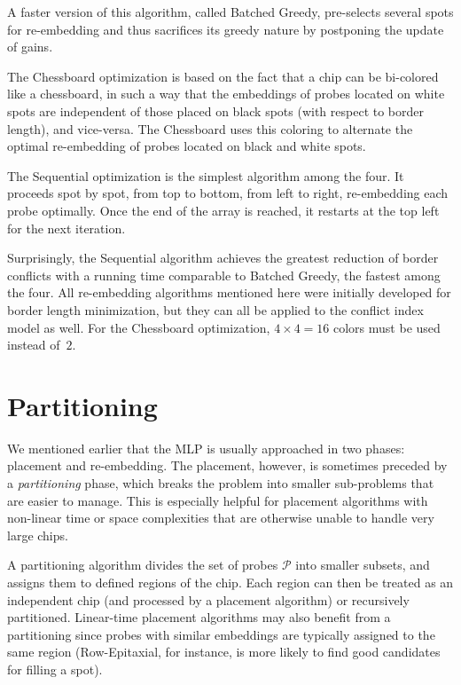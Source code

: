 \documentclass{w-edbk}
\begin{document}
A faster version of this algorithm, called Batched Greedy, pre-selects
several spots for re-embedding and thus sacrifices its greedy nature
by postponing the update of gains.

The Chessboard optimization is based on the fact that a chip can be bi-colored
like a chessboard, in such a way that the embeddings of probes located on
white spots are independent of those placed on black spots (with respect to
border length), and vice-versa. The Chessboard uses this coloring to alternate
the optimal re-embedding of probes located on black and white spots.

The Sequential optimization is the simplest algorithm among the four.
It proceeds spot by spot, from top to bottom, from left to right,
re-embedding each probe optimally. Once the end of the array is
reached, it restarts at the top left for the next iteration.

Surprisingly, the Sequential algorithm achieves the greatest reduction
of border conflicts with a running time comparable to Batched Greedy,
the fastest among the four.  All re-embedding algorithms mentioned
here were initially developed for border length minimization, but they
can all be applied to the conflict index model as well. For the
Chessboard optimization, $4\times 4=16$ colors must be used
instead of~$2$.



\section{Partitioning}
\label{sec:partition}

We mentioned earlier that the MLP is usually approached in two phases:
placement and re-embedding. The placement, however, is sometimes
preceded by a \emph{partitioning} phase, which breaks the problem into
smaller sub-problems that are easier to manage. This is especially
helpful for placement algorithms with non-linear time or space
complexities that are otherwise unable to handle very large chips.

A partitioning algorithm divides the set of probes $\mathcal{P}$ into smaller
subsets, and assigns them to defined regions of the chip. Each region can then
be treated as an independent chip (and processed by a placement algorithm) or
recursively partitioned. Linear-time placement algorithms may also benefit from
a partitioning since probes with similar embeddings are typically assigned to
the same region (Row-Epitaxial, for instance, is more likely to find good
candidates for filling a spot).
\end{document}

